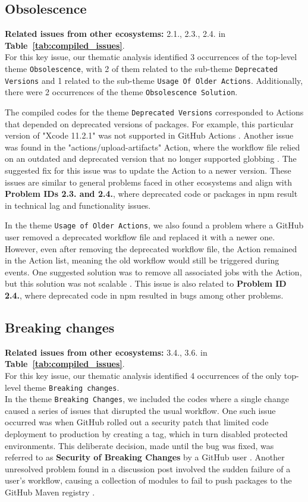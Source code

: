 \documentclass[conference]{IEEEtran}
\begin{document}
\subsection*{\textbf{Obsolescence}}
\textbf{Related issues from other ecosystems:} 2.1., 2.3., 2.4. in \textbf{Table~\ref{tab:compiled_issues}}.\\

	For this key issue, our thematic analysis identified 3 occurrences of the top-level theme \texttt{Obsolescence}, with 2 of them related to the sub-theme \texttt{Deprecated Versions} and 1 related to the sub-theme \texttt{Usage Of Older Actions}. Additionally, there were 2  occurrences of the theme \texttt{Obsolescence Solution}.

	The compiled codes for the theme \texttt{Deprecated Versions} corresponded to Actions that depended on deprecated versions of packages. For example, this particular version of "Xcode 11.2.1" was not supported in GitHub Actions \cite{sinoru2024}. Another issue was found in the "actions/upload-artifacts" Action, where the workflow file relied on an outdated and deprecated version that no longer supported globbing \cite{graysuit2024}. The suggested fix for this issue was to update the Action to a newer version. These issues are similar to general problems faced in other ecosystems and align with \textbf{Problem IDs 2.3. and 2.4.}, where deprecated code or packages in npm result in technical lag and functionality issues.

	In the theme \texttt{Usage of Older Actions}, we also found a problem where a GitHub user removed a deprecated workflow file and replaced it with a newer one. However, even after removing the deprecated workflow file, the Action remained in the Action list, meaning the old workflow would still be triggered during events. One suggested solution was to remove all associated jobs with the Action, but this solution was not scalable \cite{ryanvanderpol2024}. This issue is also related to \textbf{Problem ID 2.4.}, where deprecated code in npm resulted in bugs among other problems.
\subsection*{\textbf{Breaking changes}}
\textbf{Related issues from other ecosystems:} 3.4., 3.6. in \textbf{Table~\ref{tab:compiled_issues}}.\\

	For this key issue, our thematic analysis identified 4 occurrences of the only  top-level theme \texttt{Breaking changes}.\\
In the theme \texttt{Breaking Changes}, we included the codes where a single change caused a series of issues that disrupted the usual workflow. One such issue occurred was when GitHub rolled out a security patch that limited code deployment to production by creating a tag, which in turn disabled protected environments. This deliberate decision, made until the bug was fixed, was referred to as \textbf{Security of Breaking Changes} by a GitHub user \cite{WolfspiritM2024}. Another unresolved problem found in a discussion post involved the sudden failure of a user's workflow, causing a collection of modules to fail to push packages to the GitHub Maven registry \cite{lukas-krecan2024}.
\end{document}
